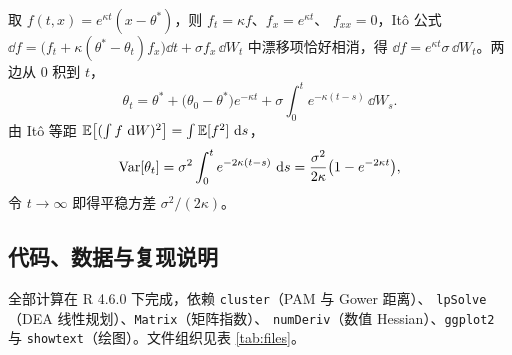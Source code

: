 取 $f(t,x)=e^{\kappa t}(x-\theta^{*})$，则 $f_t=\kappa f$、$f_x=e^{\kappa t}$、
$f_{xx}=0$，Itô 公式
$\dd f=\bigl(f_t+\kappa(\theta^{*}-\theta_t)f_x\bigr)\dd t+\sigma f_x\,\dd W_t$
中漂移项恰好相消，得 $\dd f=e^{\kappa t}\sigma\,\dd W_t$。两边从 $0$ 积到 $t$，
\begin{equation}
\theta_t=\theta^{*}+\bigl(\theta_0-\theta^{*}\bigr)e^{-\kappa t}
+\sigma\int_0^{t}e^{-\kappa(t-s)}\,\dd W_s .
\end{equation}
由 Itô 等距 $\mathbb{E}\bigl[(\int f\,\,\mathrm{d} W)^2\bigr]=\int\mathbb{E}[f^2]\,\,\mathrm{d} s$，
\begin{equation}
\operatorname{Var}[\theta_t]=\sigma^{2}\int_0^{t}e^{-2\kappa(t-s)}\,\,\mathrm{d} s
=\frac{\sigma^{2}}{2\kappa}\bigl(1-e^{-2\kappa t}\bigr),
\end{equation}
令 $t\to\infty$ 即得平稳方差 $\sigma^{2}/(2\kappa)$。

\subsection{代码、数据与复现说明}

全部计算在 R 4.6.0 下完成，依赖 \texttt{cluster}（PAM 与 Gower 距离）、
\texttt{lpSolve}（DEA 线性规划）、\texttt{Matrix}（矩阵指数）、
\texttt{numDeriv}（数值 Hessian）、\texttt{ggplot2} 与
\texttt{showtext}（绘图）。文件组织见表 \ref{tab:files}。


